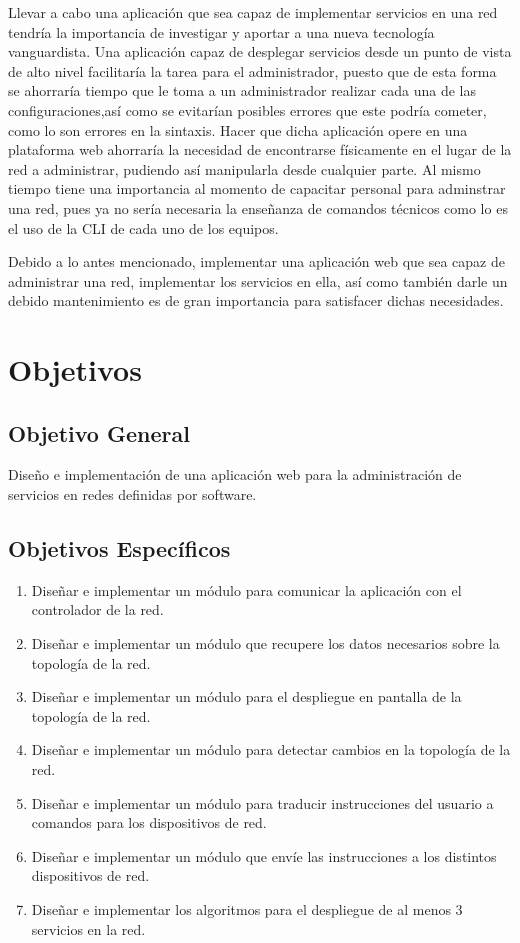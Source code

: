 Llevar a cabo una aplicación que sea capaz de implementar servicios en una red tendría la importancia de investigar y aportar 
a una nueva tecnología vanguardista. Una aplicación capaz de 
desplegar servicios desde un punto de vista de alto nivel facilitaría la tarea para el administrador, puesto que de esta
forma se ahorraría tiempo que le toma a un administrador realizar cada una de las configuraciones,así 
como se evitarían posibles errores que este podría cometer, como lo son errores en la sintaxis. Hacer que dicha 
aplicación opere en una plataforma web ahorraría la necesidad de encontrarse físicamente en el lugar de la red a administrar,
pudiendo así manipularla desde cualquier parte. Al mismo tiempo tiene una importancia al momento de 
capacitar personal para adminstrar una red, pues ya no sería necesaria la enseñanza de comandos técnicos como lo es el uso de la CLI 
de cada uno de los equipos.

Debido a lo antes mencionado, implementar una aplicación  web que sea capaz de administrar una red, implementar los servicios en 
ella, así como también darle un debido mantenimiento es de gran importancia para satisfacer dichas necesidades.
\section*{Objetivos}

\subsection*{Objetivo General}
Diseño e implementación de una aplicación web para la administración de servicios en redes definidas por software.

\subsection*{Objetivos Específicos}
\begin{enumerate}
  \item Diseñar e implementar un módulo para comunicar la aplicación con el controlador de la red.
  \item Diseñar e implementar un módulo que recupere los datos necesarios sobre la topología de la red.
  \item Diseñar e implementar un módulo para el despliegue en pantalla de la topología de la red.
  \item Diseñar e implementar un módulo para detectar cambios en la topología de la red.
  \item Diseñar e implementar un módulo para traducir instrucciones del usuario a comandos para los dispositivos de red.
  \item Diseñar e implementar un módulo que envíe las instrucciones a los distintos dispositivos de red.
  \item Diseñar e implementar los algoritmos para el despliegue de al menos 3 servicios en la red. 
\end{enumerate}

